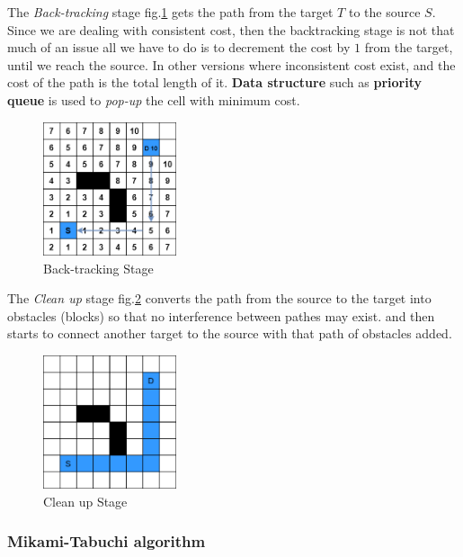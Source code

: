     The \textit{Back-tracking} stage fig.\ref{fig:backtrackingStage} gets the path from the target $T$
    to the source $S$.
    Since we are dealing with consistent cost, then the backtracking stage is not that much of an issue
    all we have to do is to decrement the cost by $1$ from the target, until we reach the source.
    In other versions where inconsistent cost exist, and the cost of the path is the total length of it.
    \textbf{Data structure} such as \textbf{priority queue} is used to \textit{pop-up}
    the cell with minimum cost.

    \begin{figure}[H]
        \centering
        \includegraphics[width=0.35\textwidth]{figures/Lee Stages/back-track.png}
        \caption{Back-tracking Stage}
        \label{fig:backtrackingStage}
    \end{figure}

    The \textit{Clean up} stage fig.\ref{fig:cleanUpStage} converts the path from the source
    to the target into obstacles (blocks) so that no interference between pathes may exist.
    and then starts to connect another target to the source with that path of obstacles added.

    \begin{figure}[H]
        \centering
        \includegraphics[width=0.35\textwidth]{figures/Lee Stages/clean_up.png}
        \caption{Clean up Stage}
        \label{fig:cleanUpStage}
    \end{figure}

    \subsubsection{Mikami-Tabuchi algorithm}
    \label{MikamiSection}
    

